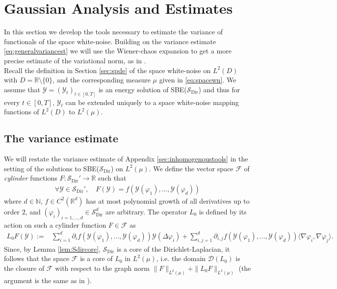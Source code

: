 \documentclass[a4paper, reqno, 12pt]{amsart}
\theoremstyle{plain}
\theoremstyle{definition}
\newcommand{\R}{\mathbb{R}}
\newcommand{\Sdir}{\mathcal{S}_{\text{Dir}}}
\newcommand{\leander}[1]{\textcolor{red}{(L: #1)}}
\begin{document}
\section{Gaussian Analysis and Estimates} 
\label{app:gaussian}

In this section we develop the tools necessary to estimate the variance of functionals of the space {white-noise}. Building on the variance estimate \eqref{eq:generalvariancest} we will use the Wiener-chaos expansion to get a more precise estimate of the variational norm, as in \cite[Section 3]{GP18}.\\
Recall the definition in Section \ref{sec:spde} of the space white-noise on $L^2(D)$ with $D=\R\setminus\{0\}$, and the corresponding measure $\mu$ given in \eqref{eq:spacewn}. We assume that $\mathcal Y = (\mathcal Y_t)_{t\in[0,T]}$ is an energy solution of SBE($\Sdir$) and thus for every $t\in [0,T]$, $\mathcal Y_t$ can be extended uniquely to a space white-noise mapping functions of $L^2(D)$ to $L^2(\mu)$. 

\subsection{The variance estimate}
We will restate the variance estimate of Appendix \ref{sec:inhomogenoustools} in the setting of the solutions to SBE($\Sdir$) on $L^2(\mu)$.
We define the vector space $\mathcal{F}$ of {\textit{cylinder}} functions $F:\Sdir'\to \R$ such that
\begin{align*}
   \forall \mathcal Y \in \Sdir', \quad  F(\mathcal{Y}) =  f(\mathcal{Y}(\varphi_1),...,\mathcal{Y}(\varphi_d))
\end{align*}
where $d\in\mathbb{N}$,  $f\in C^2(\R^d)$ has at most polynomial growth of all derivatives up to order $2$, and $(\varphi_i)_{i=1, \ldots,d} \in\Sdir^d$ are arbitrary. The operator $L_0$ is defined by its action on such a cylinder function $F\in\mathcal F$ as 
\begin{align*}
    L_0F(\mathcal{Y}) := &\sum_{i=1}^d \partial_if(\mathcal{Y}(\varphi_1),...,\mathcal{Y}(\varphi_d))\mathcal{Y}(\Delta\varphi_i) +\sum_{i,j=1}^d \partial_{i,j}f(\mathcal{Y}(\varphi_1),...,\mathcal{Y}(\varphi_d))\langle \nabla\varphi_i,\nabla\varphi_j\rangle.
\end{align*}
Since, by Lemma \ref{lem:Sdircore}, $\Sdir$ is a core of the Dirichlet-Laplacian, it follows that the space $\mathcal F$ is a core of $L_0$ in $L^2(\mu)$, i.e. the domain $\mathcal D(L_0)$ is the closure of $\mathcal F$ with respect to the graph norm  $\|F\|_{L^2(\mu)} + \|L_0F\|_{L^2(\mu)}$ (the argument is the same as in \cite[Corollary 3.8]{GP18}). 
\end{document}
